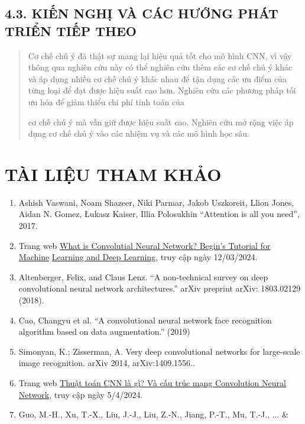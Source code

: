 \documentclass[
]{article}
\begin{document}
\subsection{4.3. KIẾN NGHỊ VÀ CÁC HƯỚNG PHÁT TRIỂN TIẾP THEO}\label{kiux1ebfn-nghux1ecb}

\begin{quote}
Cơ chế chú ý đã thật sự mang lại hiệu quả tốt cho mô hình CNN, vì vậy
thông qua nghiên cứu này có thể nghiên cứu thêm các cơ chế chú ý khác và
áp dụng nhiều cơ chế chú ý khác nhau để tận dụng các ưu điểm của từng
loại để đạt được hiệu suất cao hơn. Nghiên cứu các phương pháp tối ưu
hóa để giảm thiểu chi phí tính toán của

cơ chế chú ý mà vẫn giữ được hiệu suất cao. Nghiên cứu mở rộng việc áp
dụng cơ chế chú ý vào các nhiệm vụ và các mô hình học sâu.
\end{quote}

\section{TÀI LIỆU THAM KHẢO}\label{tuxe0i-liux1ec7u-tham-khux1ea3o}

\begin{enumerate}
\def\labelenumi{\arabic{enumi}.}
\item
  Ashish Vaswani, Noam Shazeer, Niki Parmar, Jakob Uszkoreit, Llion
  Jones, Aidan N. Gomez, Łukasz Kaiser, Illia Polosukhin ``Attention is
  all you need'', 2017.
\item
  Trang web \ul{What is Convolutial Neural Network? Begin's Tutorial for
  Machine} \ul{Learning and Deep Learning}, truy cập ngày 12/03/2024.
\item
  Altenberger, Felix, and Claus Lenz. ``A non-technical survey on deep
  convolutional neural network architectures.'' arXiv preprint arXiv:
  1803.02129 (2018).
\item
  Cao, Changyu et al. ``A convolutional neural network face recognition
  algorithm based on data augmentation.'' (2019)
\item
  Simonyan, K.; Zisserman, A. Very deep convolutional networks for
  large-scale image recognition. arXiv 2014, arXiv:1409.1556..
\item
  Trang web \ul{Thuật toán CNN là gì? Và cấu trúc mạng Convolution
  Neural} \ul{Network}, truy cập ngày 5/4/2024.
\item
  Guo, M.-H., Xu, T.-X., Liu, J.-J., Liu, Z.-N., Jiang, P.-T., Mu,
  T.-J., ... \&
\end{enumerate}
\end{document}
